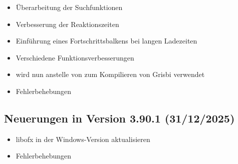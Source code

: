 \begin{itemize}
	\item Überarbeitung der Suchfunktionen
	\item Verbesserung der Reaktionszeiten
	\item Einführung eines Fortschrittsbalkens bei langen Ladezeiten
	\item Verschiedene Funktionsverbesserungen
	\item {} wird nun anstelle von  zum Kompilieren von Grisbi verwendet
	\item Fehlerbehebungen
\end{itemize}

\subsection{Neuerungen in Version 3.90.1 \textnormal{(31/12/2025)}}

\begin{itemize}
	\item libofx in der Windows-Version aktualisieren
	\item Fehlerbehebungen
\end{itemize}

